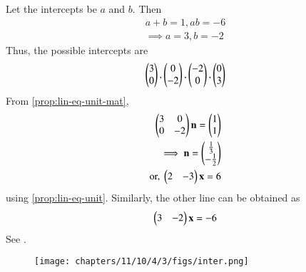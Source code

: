 Let the intercepts be $a$ and  $b$. Then
\begin{align}
a+b=1,
ab=-6 \label{eq:11/10/4/32a}
\\
\implies  a = 3, b = -2
\end{align}
Thus, the possible 
intercepts are
\begin{align}
\begin{pmatrix}3\\0\end{pmatrix}, \begin{pmatrix}0\\-2\end{pmatrix},
\begin{pmatrix}-2\\0\end{pmatrix}, \begin{pmatrix}0\\3\end{pmatrix}
\end{align}
From
		\eqref{prop:lin-eq-unit-mat},
\begin{align}
	\begin{pmatrix}3 & 0 \\ 0 &-2\end{pmatrix}\mathbf{n} = \begin{pmatrix}1 \\ 1\end{pmatrix}
	\\
	\implies \mathbf{n} = \begin{pmatrix}\frac{1}{3} \\ -\frac{1}{2}\end{pmatrix}
	\\
	\text{or, } \begin{pmatrix}2 & -3\end{pmatrix}\mathbf{x} = 6
\end{align}
using		\eqref{prop:lin-eq-unit}.
Similarly, the other line can be obtained
as
\begin{align}
	\begin{pmatrix} 3 & -2 \end{pmatrix}  \mathbf{x}  = -6        
\end{align}
See  
.
\begin{figure}[H]
\centering
\texttt{[image: chapters/11/10/4/3/figs/inter.png]}
\caption{}
\label{fig:11/10/4/3line segmenta}
\end{figure}
